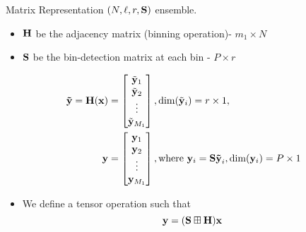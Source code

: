 \begin{frame}{Matrix Representation}
$(N,\ell,r,\mathbf{S})$ ensemble. 
\begin{itemize}
\item $\mathbf{H}$ be the adjacency matrix (binning operation)- $m_1 \times N$
\item $\mathbf{S}$ be the bin-detection matrix at each bin - $P \times r$
\end{itemize}
\begin{align*}
\mbf{\tilde{y}=H(x)}&= 
\begin{bmatrix}
   \tilde{\mbf{ y}}_{1} \\
   \tilde{ \mbf{y}}_{2} \\
    \vdots \\
   \tilde{\mbf{y}}_{M_1}
\end{bmatrix}
,\text{dim}(\tilde{\mbf{y}}_{i} )=r \times 1,
\\
\vspace{10pt}
\mbf{y}&= 
\begin{bmatrix}
   \mbf{ y}_{1}\\
    \mbf{y}_{2}  \\
    \vdots \\
    \mbf{y}_{M_1}
\end{bmatrix}
, \text{where } \mbf{y}_i= \mbf{S \tilde{y}}_{i}, \text{dim} (\mbf{y}_i)=P \times 1   
\end{align*}
\begin{itemize}
\item We define a tensor operation such that 
\begin{equation*}
\mathbf{y=(S\boxplus H)  x}
\end{equation*}
\end{itemize}
\end{frame}

